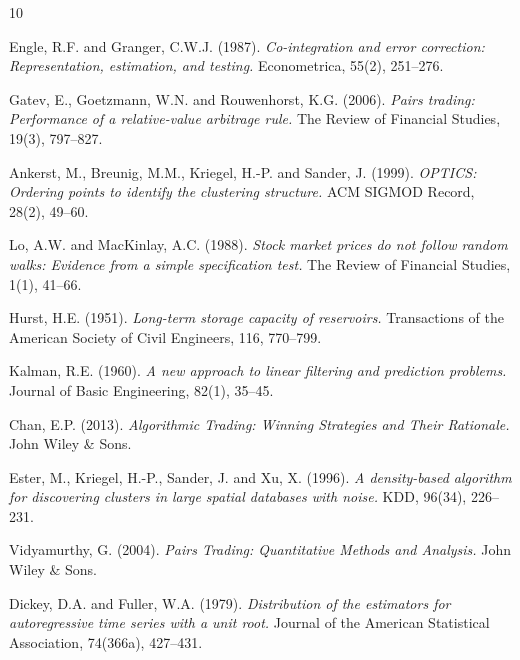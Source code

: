 \documentclass[11pt, a4paper]{article}
\begin{document}
\begin{thebibliography}{10}

Engle, R.F. and Granger, C.W.J. (1987).
\textit{Co-integration and error correction: Representation, estimation, and testing.}
Econometrica, 55(2), 251--276.

Gatev, E., Goetzmann, W.N. and Rouwenhorst, K.G. (2006).
\textit{Pairs trading: Performance of a relative-value arbitrage rule.}
The Review of Financial Studies, 19(3), 797--827.

Ankerst, M., Breunig, M.M., Kriegel, H.-P. and Sander, J. (1999).
\textit{OPTICS: Ordering points to identify the clustering structure.}
ACM SIGMOD Record, 28(2), 49--60.

Lo, A.W. and MacKinlay, A.C. (1988).
\textit{Stock market prices do not follow random walks: Evidence from a simple specification test.}
The Review of Financial Studies, 1(1), 41--66.

Hurst, H.E. (1951).
\textit{Long-term storage capacity of reservoirs.}
Transactions of the American Society of Civil Engineers, 116, 770--799.

Kalman, R.E. (1960).
\textit{A new approach to linear filtering and prediction problems.}
Journal of Basic Engineering, 82(1), 35--45.

Chan, E.P. (2013).
\textit{Algorithmic Trading: Winning Strategies and Their Rationale.}
John Wiley \& Sons.

Ester, M., Kriegel, H.-P., Sander, J. and Xu, X. (1996).
\textit{A density-based algorithm for discovering clusters in large spatial databases with noise.}
KDD, 96(34), 226--231.

Vidyamurthy, G. (2004).
\textit{Pairs Trading: Quantitative Methods and Analysis.}
John Wiley \& Sons.

Dickey, D.A. and Fuller, W.A. (1979).
\textit{Distribution of the estimators for autoregressive time series with a unit root.}
Journal of the American Statistical Association, 74(366a), 427--431.

\end{thebibliography}
\end{document}
